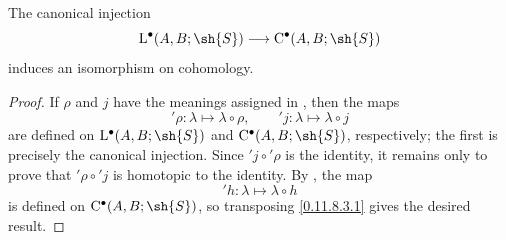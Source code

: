 \begin{proposition}[11.8.5]
\label{0.11.8.5}
The canonical injection
\[
  \mathrm{L}^\bullet(A,B;\sh{S})
  \longrightarrow
  \mathrm{C}^\bullet(A,B;\sh{S})
\]
induces an isomorphism on cohomology.
\end{proposition}

\begin{proof}
If $\rho$ and $j$ have the meanings assigned in , then
the maps
\[
  {}'\!\rho:\lambda\longmapsto\lambda\circ\rho,
  \qquad
  {}'\!j:\lambda\longmapsto\lambda\circ j
\]
are defined on $\mathrm{L}^\bullet(A,B;\sh{S})$ and
$\mathrm{C}^\bullet(A,B;\sh{S})$, respectively; the first is precisely
the canonical injection.
Since ${}'\!j\circ{}'\!\rho$ is the identity, it remains only to prove
that ${}'\!\rho\circ{}'\!j$ is homotopic to the identity.
By , the map
\[
  {}'\!h:\lambda\longmapsto\lambda\circ h
\]
is defined on $\mathrm{C}^\bullet(A,B;\sh{S})$, so transposing
\eqref{0.11.8.3.1} gives the desired result.
\end{proof}

